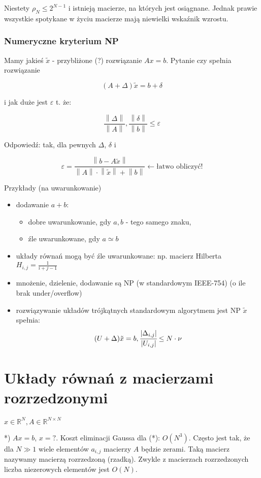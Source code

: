 \documentclass[hidelinks,a4paper,fleqn]{article}
\newcommand{\RR}{\mathbb{R}}
\newcommand{\la}{\leftarrow}
\newcommand{\norm}[1]{\left\lVert#1\right\rVert}
\begin{document}
Niestety $\rho_N \leq 2^{N-1}$ i istnieją macierze, na których jest osiągnane. Jednak prawie wszystkie spotykane w życiu macierze mają niewielki wskaźnik wzrostu.

\subsubsection{Numeryczne kryterium NP}

Mamy jakieś $\tilde{x}$ - przybliżone (?) rozwiązanie $Ax = b$. Pytanie czy spełnia rozwiązanie

\[
	(A + \Delta)\tilde{x} = b + \delta
\]

i jak duże jest $\varepsilon$ t. że:

\[
	\frac{\norm{\Delta}}{\norm{A}}, \frac{\norm{\delta}}{\norm{b}} \leq \varepsilon
\]

Odpowiedź: tak, dla pewnych $\Delta$, $\delta$ i 

\[
	\varepsilon = \frac{\norm{b - A\tilde{x}}}{\norm{A} \cdot \norm{\tilde{x}} + \norm{b}} \la \textrm{łatwo obliczyć!}
\]

Przykłady (na uwarunkowanie)

\begin{itemize}
	\item dodawanie $a+b$:
	      \begin{itemize}
	      	\item dobre uwarunkowanie, gdy $a, b$ -  tego samego znaku,
	      	\item źle uwarunkowane, gdy $a \simeq b$
	      \end{itemize}
	\item układy równań mogą być źle uwarunkowane: np. macierz Hilberta $H_{i,j} = \frac{1}{i+j-1}$
	\item mnożenie, dzielenie, dodawanie są NP (w standardowym IEEE-754) (o ile brak under/overflow)
	\item rozwiązywanie układów trójkątnych standardowym algorytmem jest NP $\tilde{x}$ spełnia:
	      \[
	      	(U+\Delta)\tilde{x} = b, \cfrac{|\Delta_{i, j}|}{|U_{i, j}|} \leq N \cdot \nu
	      \]
\end{itemize}

\section{Układy równań z macierzami rozrzedzonymi}

$x \in \RR^N, A \in \RR^{N \times N}$

*) $Ax = b$, $x = ?$. Koszt eliminacji Gaussa dla (*): $O(N^3)$. Często jest tak, że dla $N \gg 1$ wiele elementów $a_{i,j}$ macierzy $A$ będzie zerami. Taką macierz nazywamy macierzą rozrzedzoną (rzadką). Zwykle z macierzach rozrzedzonych liczba niezerowych elementów jest $O(N)$.
\end{document}

